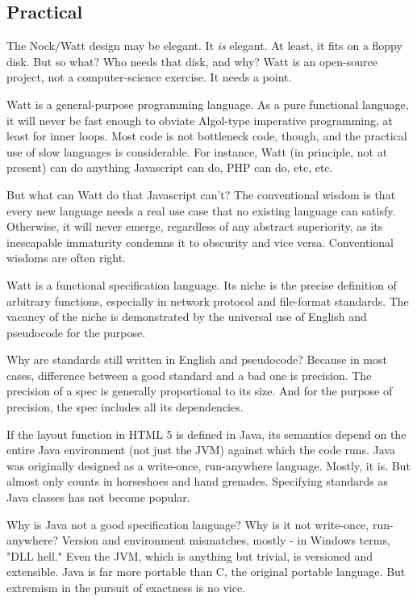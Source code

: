\documentclass[10pt, nocopyrightspace]{sigplanconf}
\begin{document}
\subsection{Practical}

The Nock/Watt design may be elegant.  It \emph{is} elegant.  At least,
it fits on a floppy disk.  But so what?  Who needs that disk, and
why?  Watt is an open-source project, not a computer-science
exercise.  It needs a point.

Watt is a general-purpose programming language.  As a pure
functional language, it will never be fast enough to obviate
Algol-type imperative programming, at least for inner loops.
Most code is not bottleneck code, though, and the practical use
of slow languages is considerable.  For instance, Watt (in
principle, not at present) can do anything Javascript can do,
PHP can do, etc, etc.

But what can Watt do that Javascript can't?  The conventional
wisdom is that every new language needs a real use case that no
existing language can satisfy.  Otherwise, it will never emerge,
regardless of any abstract superiority, as its inescapable
immaturity condemns it to obscurity and vice versa.  Conventional
wisdoms are often right.

Watt is a functional specification language.  Its niche is the
precise definition of arbitrary functions, especially in network
protocol and file-format standards.  The vacancy of the niche is
demonstrated by the universal use of English and pseudocode for
the purpose.

Why are standards still written in English and pseudocode?
Because in most cases, difference between a good standard and a
bad one is precision.  The precision of a spec is generally
proportional to its size.  And for the purpose of precision, the
spec includes all its dependencies.

If the layout function in HTML 5 is defined in Java, its
semantics depend on the entire Java environment (not just the
JVM) against which the code runs.  Java was originally designed
as a write-once, run-anywhere language.  Mostly, it is.  But
almost only counts in horseshoes and hand grenades.
Specifying standards as Java classes has not become popular.

Why is Java not a good specification language?  Why is it not
write-once, run-anywhere?  Version and environment mismatches,
mostly - in Windows terms, "DLL hell."  Even the JVM, which is
anything but trivial, is versioned and extensible.  Java is far
more portable than C, the original portable language.  But
extremism in the pursuit of exactness is no vice.
 
\end{document}
